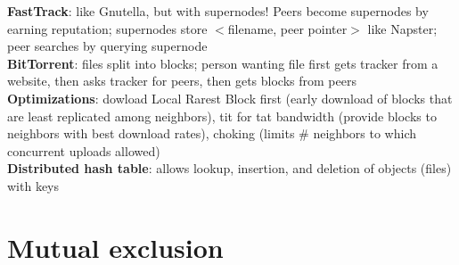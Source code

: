 \documentclass{article}
\begin{document}
\begin{multicols*}{3}
\textbf{FastTrack}: like Gnutella, but with supernodes! Peers become supernodes by earning reputation; supernodes store $<$filename, peer pointer$>$ like Napster; peer searches by querying supernode \\
\textbf{BitTorrent}: files split into blocks; person wanting file first gets tracker from a website, then asks tracker for peers, then gets blocks from peers \\
\textbf{Optimizations}: dowload Local Rarest Block first (early download of blocks that are least replicated among neighbors), tit for tat bandwidth (provide blocks to neighbors with best download rates), choking (limits \# neighbors to which concurrent uploads allowed) \\
\textbf{Distributed hash table}: allows lookup, insertion, and deletion of objects (files) with keys \\

\section{Mutual exclusion}


\end{multicols*}
\end{document}
